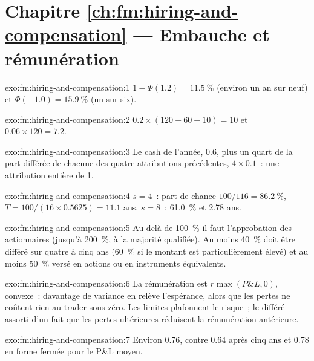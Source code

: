 \section*{Chapitre \ref{ch:fm:hiring-and-compensation} --- Embauche et rémunération}

\begin{solution}{exo:fm:hiring-and-compensation:1}
$1-\Phi(1.2)=11.5~\%$ (environ un an sur neuf) et $\Phi(-1.0)=15.9~\%$ (un sur six).
\end{solution}

\begin{solution}{exo:fm:hiring-and-compensation:2}
$0.2\times(120-60-10)=10$ et $0.06\times120=7.2$.
\end{solution}

\begin{solution}{exo:fm:hiring-and-compensation:3}
Le cash de l'année, 0.6, plus un quart de la part différée de chacune des quatre attributions précédentes, $4\times0.1$~: une attribution entière de 1.
\end{solution}

\begin{solution}{exo:fm:hiring-and-compensation:4}
$s=4$~: part de chance $100/116=86.2~\%$, $T=100/(16\times0.5625)=11.1$ ans. $s=8$~: 61.0~\% et 2.78 ans.
\end{solution}

\begin{solution}{exo:fm:hiring-and-compensation:5}
Au-delà de 100~\% il faut l'approbation des actionnaires (jusqu'à 200~\%, à la majorité qualifiée). Au moins 40~\% doit être différé sur quatre à cinq ans (60~\% si
le montant est particulièrement élevé) et au moins 50~\% versé en actions ou en instruments équivalents.
\end{solution}

\begin{solution}{exo:fm:hiring-and-compensation:6}
La rémunération est $r\max(P\&L,0)$, convexe~: davantage de variance en relève l'espérance, alors que les pertes ne coûtent rien au trader sous zéro. Les limites plafonnent le risque~; le différé
assorti d'un  fait que les pertes ultérieures réduisent la rémunération antérieure.
\end{solution}

\begin{solution}{exo:fm:hiring-and-compensation:7}
Environ 0.76, contre 0.64 après cinq ans et 0.78 en forme fermée pour le P\&L moyen.
\end{solution}

